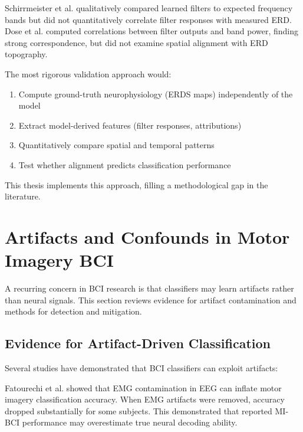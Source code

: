 Schirrmeister et al. \cite{schirrmeister2017deep} qualitatively compared learned filters to expected frequency bands but did not quantitatively correlate filter responses with measured ERD. Dose et al. \cite{dose2018cnn} computed correlations between filter outputs and band power, finding strong correspondence, but did not examine spatial alignment with ERD topography.

The most rigorous validation approach would:

\begin{enumerate}
    \item Compute ground-truth neurophysiology (ERDS maps) independently of the model
    \item Extract model-derived features (filter responses, attributions)
    \item Quantitatively compare spatial and temporal patterns
    \item Test whether alignment predicts classification performance
\end{enumerate}

This thesis implements this approach, filling a methodological gap in the literature.


\section{Artifacts and Confounds in Motor Imagery BCI}
\label{sec:rw_artifacts}

A recurring concern in BCI research is that classifiers may learn artifacts rather than neural signals. This section reviews evidence for artifact contamination and methods for detection and mitigation.


\subsection{Evidence for Artifact-Driven Classification}
\label{subsec:rw_artifact_evidence}

Several studies have demonstrated that BCI classifiers can exploit artifacts:

Fatourechi et al. \cite{fatourechi2007emg} showed that EMG contamination in EEG can inflate motor imagery classification accuracy. When EMG artifacts were removed, accuracy dropped substantially for some subjects. This demonstrated that reported MI-BCI performance may overestimate true neural decoding ability.

